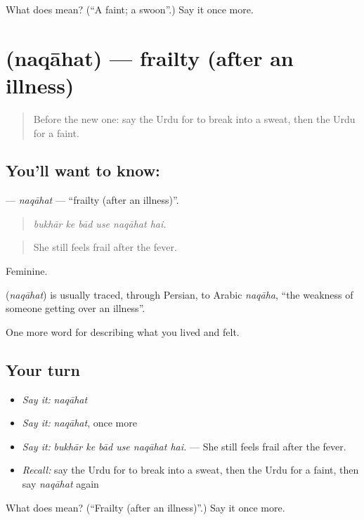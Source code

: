 \begin{tcolorbox}[breakable,colback=teal!4,colframe=teal!35!black,title={Before you move on}]
What does  mean? (\textquotedblleft{}A faint; a swoon\textquotedblright{}.) Say it once more.
\end{tcolorbox}
\section[\texorpdfstring{\ur{نقاہت} (naqāhat)}{نقاہت (naqāhat)}]{ (naqāhat) — frailty (after an illness)}

\label{lesson:UR-C470-naqahat}



\begin{quote}
Before the new one: say the Urdu for to break into a sweat, then the Urdu for a faint.
\end{quote}

\subsection*{You'll want to know: }
\textbf{} — \emph{naqāhat} — \textquotedblleft{}frailty (after an illness)\textquotedblright{}.

\begin{quote}
     
\end{quote}

\begin{quote}
\emph{bukhār ke bād use naqāhat hai.}
\end{quote}

\begin{quote}
She still feels frail after the fever.
\end{quote}

Feminine.

\begin{cousinweb}
\textbf{} (\emph{naqāhat}) is usually traced, through Persian, to Arabic \emph{naqāha}, \textquotedblleft{}the weakness of someone getting over an illness\textquotedblright{}.
\end{cousinweb}

\begin{grammarlens}[title={What you've built}]
One more word for describing what you lived and felt.
\end{grammarlens}

\subsection*{Your turn}
\begin{itemize}
\raggedright
  \item \emph{Say it:} \emph{naqāhat}
  \item \emph{Say it:} \emph{naqāhat}, once more
  \item \emph{Say it:} \emph{bukhār ke bād use naqāhat hai.} — She still feels frail after the fever.
  \item \emph{Recall:} say the Urdu for to break into a sweat, then the Urdu for a faint, then say \emph{naqāhat} again
\end{itemize}

\begin{tcolorbox}[breakable,colback=teal!4,colframe=teal!35!black,title={Before you move on}]
What does  mean? (\textquotedblleft{}Frailty (after an illness)\textquotedblright{}.) Say it once more.
\end{tcolorbox}
